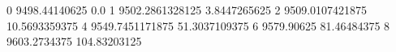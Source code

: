 0 9498.44140625 0.0
1 9502.2861328125 3.8447265625
2 9509.0107421875 10.5693359375
4 9549.7451171875 51.3037109375
6 9579.90625 81.46484375
8 9603.2734375 104.83203125
